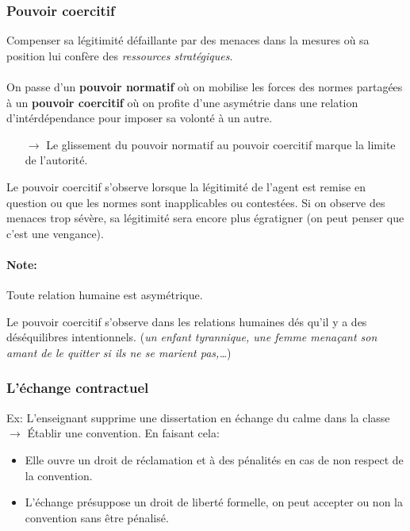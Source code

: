 \documentclass[11pt]{article} %
\begin{document}
\subsubsection{Pouvoir coercitif} 

Compenser sa légitimité défaillante par des menaces dans la mesures où
sa position lui confère des \textit{ressources stratégiques}.

\paragraph{ }
On passe d'un \textbf{pouvoir normatif} où on mobilise les forces
des normes partagées à un \textbf{pouvoir coercitif} où on profite
d'une asymétrie dans une relation d'intérdépendance pour imposer sa
volonté à un autre.

\begin{itemize}
    \item[$\to$] Le glissement du pouvoir normatif au pouvoir coercitif
marque la limite de l'autorité.
\end{itemize}

Le pouvoir coercitif s'observe lorsque la légitimité de l'agent est
remise en question ou que les normes sont inapplicables ou contestées.
Si on observe des menaces trop sévère, sa légitimité sera encore
plus égratigner (on peut penser que c'est une vengance).

\paragraph{Note: }
Toute relation humaine est asymétrique.

Le pouvoir coercitif s'observe dans les relations humaines dés qu'il
y a des déséquilibres intentionnels. (\textit{un enfant tyrannique,
une femme menaçant son amant de le quitter si ils ne se marient
pas,\ldots})


\subsubsection{L'échange contractuel} 

Ex: L'enseignant supprime une dissertation en échange du calme 
dans la classe $\to$ Établir une convention. En faisant cela:

\begin{itemize}
 \item Elle ouvre un droit de réclamation et à des pénalités en cas
de non respect de la convention.

 \item L'échange présuppose un droit de liberté formelle, on peut
 accepter ou non la convention sans être pénalisé.
\end{itemize}
\end{document}
